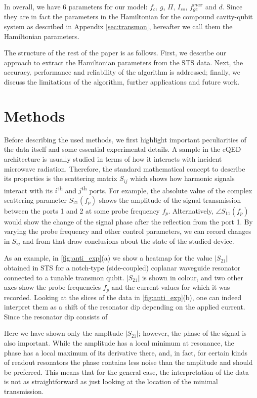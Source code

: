 \documentclass[%
 aip,
 draft,
 amsmath,amssymb,
 reprint,%
]{revtex4-1}
\begin{document}
In overall, we have 6 parameters for our model: $f_c$, $g$, $\Pi$, $I_{ss}$, $f_{ge}^{max}$ and $d$. Since they are in fact the parameters in the Hamiltonian for the compound cavity-qubit system as described in Appendix \ref{sec:transmon}, hereafter we call them the Hamiltonian parameters.

The structure of the rest of the paper is as follows. First, we describe our approach to extract the Hamiltonian parameters from the STS data. Next, the accuracy, performance and reliability of the algorithm is addressed; finally, we discuss the limitations of the algorithm, further applications and future work. 



\section{Methods}

Before describing the used methods, we first highlight important peculiarities of the data itself and some essential experimental details. A sample in the cQED architecture is usually studied in terms of how it interacts with incident microwave radiation. Therefore, the standard mathematical concept to describe its properties is the scattering matrix $S_{ij}$ which shows how harmonic signals interact with its $i$\textsuperscript{th} and $j$\textsuperscript{th} ports. For example, the absolute value of the complex scattering parameter $S_{21}(f_p)$ shows the amplitude of the signal transmission between the ports 1 and 2 at some probe frequency $f_p$. Alternatively, $\angle S_{11}(f_p)$ would show the change of the signal phase after the reflection from the port 1. By varying the probe frequency and other control parameters, we can record changes in $S_{ij}$ and from that draw conclusions about the state of the studied device.

As an example, in \autoref{fig:anti_exp}(a) we show a heatmap for the value $|S_{21}|$ obtained in STS for a notch-type (side-coupled) coplanar waveguide resonator connected to a tunable transmon qubit. $|S_{21}|$ is shown in colour, and two other axes show the probe frequencies $f_p$ and the current values for which it was recorded. Looking at the slices of the data in \autoref{fig:anti_exp}(b), one can indeed interpret them as a shift of the resonator dip depending on the applied current. Since the resonator dip consists of 

Here we have shown only the ampltude $|S_{21}|$; however, the phase of the signal is also important. While the amplitude has a local minimum at resonance, the phase has a local maximum of its derivative there, and, in fact, for certain kinds of readout resonators the phase contains less noise than the amplitude and should be preferred. This means that for the general case, the interpretation of the data is not as straightforward as just looking at the location of the minimal transmission.
\end{document}
